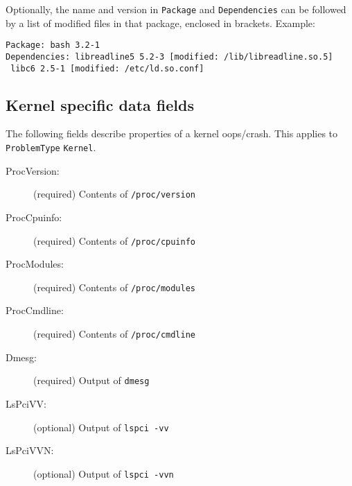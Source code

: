\documentclass[DIV12,halfparskip]{scrartcl}
\begin{document}
Optionally, the name and version in \verb!Package! and \verb!Dependencies! can
be followed by a list of modified files in that package, enclosed in brackets.
Example:

\begin{verbatim}
Package: bash 3.2-1
Dependencies: libreadline5 5.2-3 [modified: /lib/libreadline.so.5]
 libc6 2.5-1 [modified: /etc/ld.so.conf]
\end{verbatim}

\subsection{Kernel specific data fields}

The following fields describe properties of a kernel oops/crash.
This applies to \verb!ProblemType! \verb!Kernel!.

\begin{description}
    \item [ProcVersion:] (required) Contents of \verb!/proc/version!
    \item [ProcCpuinfo:] (required) Contents of \verb!/proc/cpuinfo!
    \item [ProcModules:] (required) Contents of \verb!/proc/modules!
    \item [ProcCmdline:] (required) Contents of \verb!/proc/cmdline!
    \item [Dmesg:] (required) Output of \verb!dmesg!
    \item [LsPciVV:] (optional) Output of \verb!lspci -vv!
    \item [LsPciVVN:] (optional) Output of \verb!lspci -vvn!
\end{description}
\end{document}
